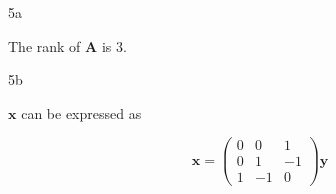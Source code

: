 \documentclass{article}
\begin{document}
\begin{homeworkProblem}

    \begin{homeworkSection}{5a}

        The rank of $\bm{A}$ is 3.

    \end{homeworkSection}

    \begin{homeworkSection}{5b}

        $\bm{x}$ can be expressed as 

        \begin{equation}
            \bm{x} = \left(\begin{matrix}
                         0 &   0 &  1 \\
                         0 &   1 & -1 \\
                         1 &  -1 &  0
            \end{matrix} \right) \bm{y}
        \end{equation}

    \end{homeworkSection}

\end{homeworkProblem}
\end{document}
